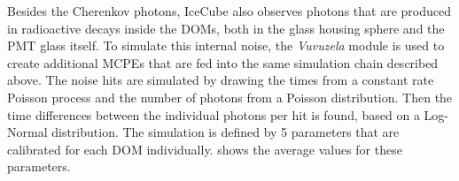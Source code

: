 Besides the Cherenkov photons, IceCube also observes photons that are produced in radioactive decays inside the DOMs, both in the glass housing sphere and the PMT glass itself. To simulate this internal noise, the \emph{Vuvuzela} module  is used to create additional MCPEs that are fed into the same simulation chain described above. The noise hits are simulated by drawing the times from a constant rate Poisson process and the number of photons from a Poisson distribution. Then the time differences between the individual photons per hit is found, based on a Log-Normal distribution. The simulation is defined by 5 parameters that are calibrated for each DOM individually.  shows the average values for these parameters.
